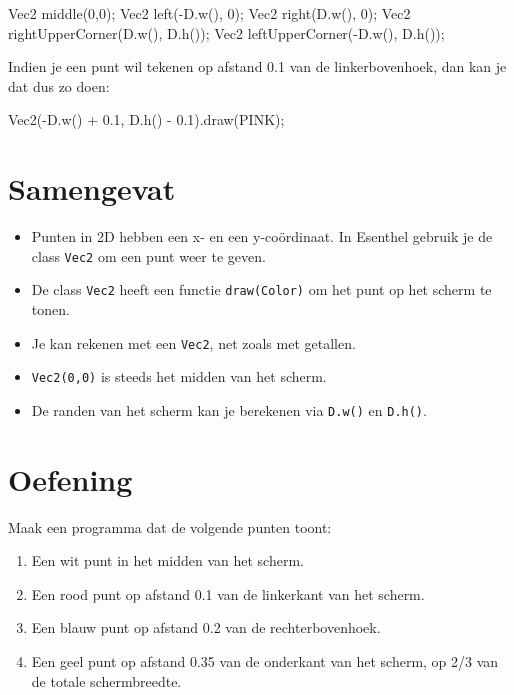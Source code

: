 \begin{code}
Vec2 middle(0,0);
Vec2 left(-D.w(), 0);
Vec2 right(D.w(), 0);
Vec2 rightUpperCorner(D.w(), D.h());
Vec2 leftUpperCorner(-D.w(), D.h());
\end{code}

Indien je een punt wil tekenen op afstand 0.1 van de linkerbovenhoek, dan kan je dat dus zo doen:

\begin{code}
Vec2(-D.w() + 0.1, D.h() - 0.1).draw(PINK);
\end{code}

\section{Samengevat}
\begin{itemize}
\item Punten in 2D hebben een x- en een y-co\"ordinaat. In Esenthel gebruik je de class \texttt{Vec2} om een punt weer te geven.
\item De class \texttt{Vec2} heeft een functie \texttt{draw(Color)} om het punt op het scherm te tonen.
\item Je kan rekenen met een \texttt{Vec2}, net zoals met getallen.
\item \texttt{Vec2(0,0)} is steeds het midden van het scherm.
\item De randen van het scherm kan je berekenen via \texttt{D.w()} en \texttt{D.h()}.
\end{itemize}

\section{Oefening}
Maak een programma dat de volgende punten toont:
\begin{enumerate}
	\item Een wit punt in het midden van het scherm.
	\item Een rood punt op afstand 0.1 van de linkerkant van het scherm.
	\item Een blauw punt op afstand 0.2 van de rechterbovenhoek.
	\item Een geel punt op afstand 0.35 van de onderkant van het scherm, op 2/3 van de totale schermbreedte.
\end{enumerate}
